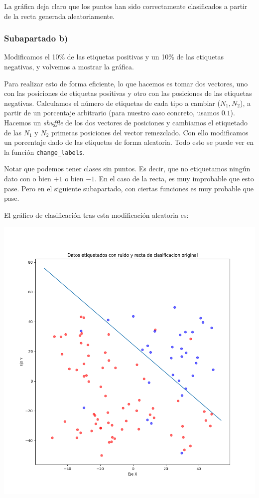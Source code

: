 \documentclass[11pt]{article}
\begin{document}
La gráfica deja claro que los puntos han sido correctamente clasificados a partir de la recta generada aleatoriamente.

\subsubsection{Subapartado b)}

Modificamos el 10\% de las etiquetas positivas y un 10\% de las etiquetas negativas, y volvemos a mostrar la gráfica.

Para realizar esto de forma eficiente, lo que hacemos es tomar dos vectores, uno con las posiciones de etiquetas positivas y otro con las posiciones de las etiquetas negativas. Calculamos el número de etiquetas de cada tipo a cambiar ($N_1, N_2$), a partir de un porcentaje arbitrario (para nuestro caso concreto, usamos $0.1$). Hacemos un \emph{shuffle} de los dos vectores de posiciones y cambiamos el etiquetado de las $N_1$ y $N_2$ primeras posiciones del vector remezclado. Con ello modificamos un porcentaje dado de las etiquetas de forma aleatoria. Todo esto se puede ver en la función \lstinline{change_labels}.

Notar que podemos tener clases sin puntos. Es decir, que no etiquetamos ningún dato con o bien $+1$ o bien $-1$. En el caso de la recta, es muy improbable que esto pase. Pero en el siguiente subapartado, con ciertas funciones es muy probable que pase.

El gráfico de clasificación tras esta modificación aleatoria es:

\includegraphics[width = 0.8 \textwidth]{puntos_clasificados_recta_aleatorizados01}
\end{document}
